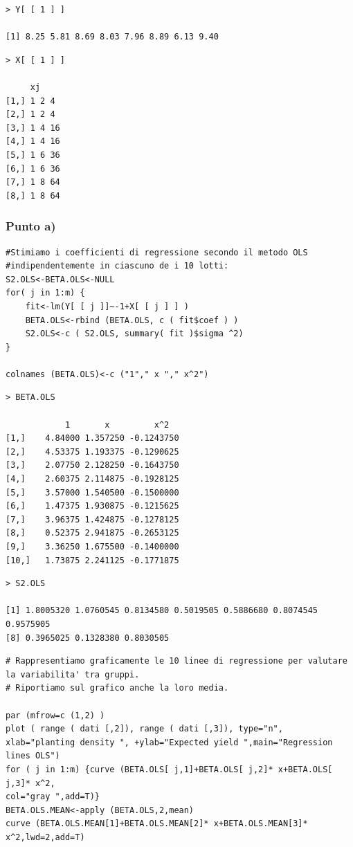 {
\color{red}
\begin{verbatim}
> Y[ [ 1 ] ]

[1] 8.25 5.81 8.69 8.03 7.96 8.89 6.13 9.40    
\end{verbatim}
}

{
\color{red}
\begin{verbatim}
> X[ [ 1 ] ]

     xj
[1,] 1 2 4
[2,] 1 2 4
[3,] 1 4 16
[4,] 1 4 16
[5,] 1 6 36
[6,] 1 6 36
[7,] 1 8 64
[8,] 1 8 64
\end{verbatim}
}

\subsubsection*{Punto a)}
\begin{lstlisting}[style=R]
#Stimiamo i coefficienti di regressione secondo il metodo OLS
#indipendentemente in ciascuno de i 10 lotti:
S2.OLS<-BETA.OLS<-NULL
for( j in 1:m) {
    fit<-lm(Y[ [ j ]]~-1+X[ [ j ] ] )
    BETA.OLS<-rbind (BETA.OLS, c ( fit$coef ) )
    S2.OLS<-c ( S2.OLS, summary( fit )$sigma ^2)
}

colnames (BETA.OLS)<-c ("1"," x "," x^2")
\end{lstlisting}

{
\color{red}
\begin{Verbatim}
> BETA.OLS

            1       x         x^2
[1,]    4.84000 1.357250 -0.1243750
[2,]    4.53375 1.193375 -0.1290625
[3,]    2.07750 2.128250 -0.1643750
[4,]    2.60375 2.114875 -0.1928125
[5,]    3.57000 1.540500 -0.1500000
[6,]    1.47375 1.930875 -0.1215625
[7,]    3.96375 1.424875 -0.1278125
[8,]    0.52375 2.941875 -0.2653125
[9,]    3.36250 1.675500 -0.1400000
[10,]   1.73875 2.241125 -0.1771875
\end{Verbatim}
}

{
\color{red}
\begin{Verbatim}
> S2.OLS

[1] 1.8005320 1.0760545 0.8134580 0.5019505 0.5886680 0.8074545 0.9575905
[8] 0.3965025 0.1328380 0.8030505
\end{Verbatim}
}

\begin{lstlisting}[style=R]
# Rappresentiamo graficamente le 10 linee di regressione per valutare la variabilita' tra gruppi. 
# Riportiamo sul grafico anche la loro media.

par (mfrow=c (1,2) )
plot ( range ( dati [,2]), range ( dati [,3]), type="n", xlab="planting density ", +ylab="Expected yield ",main="Regression lines OLS")
for ( j in 1:m) {curve (BETA.OLS[ j,1]+BETA.OLS[ j,2]* x+BETA.OLS[ j,3]* x^2,
col="gray ",add=T)}
BETA.OLS.MEAN<-apply (BETA.OLS,2,mean)
curve (BETA.OLS.MEAN[1]+BETA.OLS.MEAN[2]* x+BETA.OLS.MEAN[3]* x^2,lwd=2,add=T)

\end{lstlisting}

